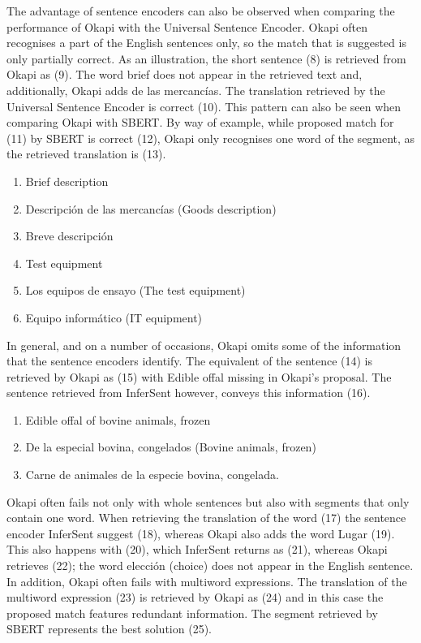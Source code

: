 The advantage of sentence encoders can also be observed when comparing the performance of Okapi with the Universal Sentence Encoder. Okapi often recognises a part of the English sentences only, so the match that is suggested is only partially correct. As an illustration, the short sentence (8) is retrieved from Okapi as (9). The word brief does not appear in the retrieved text and, additionally, Okapi adds de las mercancías. The translation retrieved by the Universal Sentence Encoder is correct (10). This pattern can also be seen when comparing Okapi with SBERT. By way of example, while proposed match for (11) by SBERT is correct (12), Okapi only recognises one word of the segment, as the retrieved translation is (13). 

\begin{enumerate}[resume,label={(\arabic*)}]
	\item	Brief description
	\item	Descripción de las mercancías (Goods description)
	\item	Breve descripción
	\item	Test equipment
	\item	Los equipos de ensayo (The test equipment)
	\item	Equipo informático (IT equipment)
\end{enumerate}


In general, and on a number of occasions, Okapi omits some of the information that the sentence encoders identify. The equivalent of the sentence (14) is retrieved by Okapi as (15) with Edible offal missing in Okapi’s proposal. The sentence retrieved from InferSent however, conveys this information (16).

\begin{enumerate}[resume,label={(\arabic*)}]
	\item	Edible offal of bovine animals, frozen
	\item	De la especial bovina, congelados (Bovine animals, frozen)
	\item	Carne de animales de la especie bovina, congelada.
\end{enumerate}

Okapi often fails not only with whole sentences but also with segments that only contain one word. When retrieving the translation of the word (17) the sentence encoder InferSent suggest (18), whereas Okapi also adds the word Lugar (19). This also happens with (20), which InferSent returns as (21), whereas Okapi retrieves (22); the word elección (choice) does not appear in the English sentence. In addition, Okapi often fails with multiword expressions. The translation of the multiword expression (23) is retrieved by Okapi as (24) and in this case the proposed match features redundant information. The segment retrieved by SBERT represents the best solution (25).


